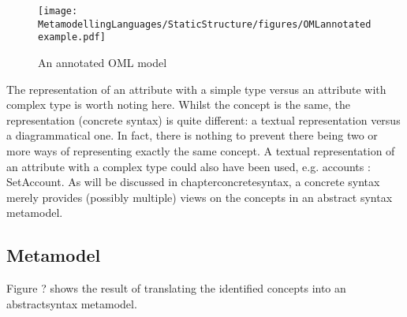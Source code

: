 \begin{figure}[htb]
\begin{center}
\texttt{[image: MetamodellingLanguages/StaticStructure/figures/OMLannotatedexample.pdf]}
\caption{An annotated OML model}
\label{omlannotatedexample}
\end{center}
\end{figure}

The representation of an attribute with a simple type versus an attribute with complex type is worth noting here. Whilst the concept is the same, the representation (concrete syntax) is quite different: a textual representation versus a diagrammatical one. In fact, there is nothing to prevent there being two or more ways of representing exactly the same concept. A textual representation of an attribute with a complex type could also have been used, e.g. accounts : Set{Account}.
As will be discussed in chapter{concretesyntax}, a concrete syntax merely provides (possibly multiple) views on the concepts in an abstract syntax metamodel.

\subsection{Metamodel}

Figure ? shows the result of translating the identified concepts into an abstractsyntax metamodel.